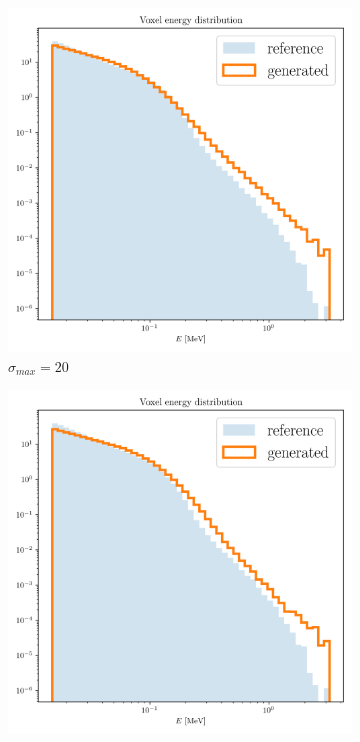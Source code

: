 \begin{figure}
    \centering
    \begin{subfigure}[b]{0.23\textwidth}
        \centering
        \includegraphics[width=\textwidth]{Figures/ve20_7.png}
        \caption{$\sigma_{max}=20$}
        \label{fig:ve20_7}
    \end{subfigure}
    \hfill
    \begin{subfigure}[b]{0.23\textwidth}
        \centering
        \includegraphics[width=\textwidth]{Figures/ve10_7.png}

\end{subfigure}
\end{figure}
